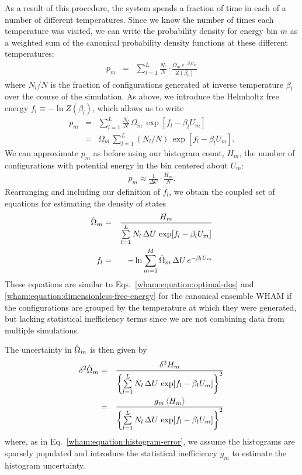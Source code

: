 As a result of this procedure, the system spends a fraction of time in each of a number of different temperatures.  Since we know the number of times each temperature was visited, we can write the probability density for energy bin $m$ as a weighted sum of the canonical probability density functions at these different temperatures:
\begin{eqnarray}
p_m &=& \sum_{l=1}^L \frac{N_l}{N} \cdot \frac{\Omega_m \, e^{-\beta_l U_m}}{Z(\beta_l)} \label{wham:equation:simulated-tempering-sampling-distribution}
\end{eqnarray}
where $N_l/N$ is the fraction of configurations generated at inverse temperature $\beta_l$ over the course of the simulation.  As above, we introduce the Helmholtz free energy $f_l \equiv - \ln Z(\beta_l)$, which allows us to write
\begin{eqnarray}
p_m &=& \sum_{l=1}^L \frac{N_l}{N} \, \Omega_m \, \exp[f_l -  \beta_l U_m] \nonumber \\
&=& \Omega_m \, \sum_{l = 1}^L (N_l / N) \, \exp[ f_l - \beta_l U_m ] .
\end{eqnarray}
We can approximate $p_m$ as before using our histogram count, $H_m$, the number of configurations with potential energy in the bin centered about $U_m$:
\begin{eqnarray}
p_m \approx \frac{1}{\Delta U} \cdot \frac{H_m}{N} .
\end{eqnarray}
Rearranging and including our definition of $f_l$, we obtain the coupled set of equations for estimating the density of states
\begin{eqnarray}
\hat{\Omega}_m &=& \frac{H_m}{\sum\limits_{l=1}^L N_l \, \Delta U \, \exp[f_l - \beta_l U_m]} \label{wham:equation:simulated-tempering-dos} \\
f_l &=& - \ln \sum_{m=1}^M \hat{\Omega}_m \, \Delta U \, e^{-\beta_l U_m}
\end{eqnarray}
These equations are similar to Eqs.\ \ref{wham:equation:optimal-dos} and \ref{wham:equation:dimensionless-free-energy} for the canonical ensemble WHAM if the configurations are grouped by the temperature at which they were generated, but lacking statistical inefficiency terms since we are not combining data from multiple simulations.  

The uncertainty in $\hat{\Omega}_m$ is then given by
\begin{eqnarray}
\delta^2 \hat{\Omega}_m &=& \frac{\delta^2 H_m}{\left\{ \sum\limits_{l=1}^L N_l \, \Delta U \, \exp[f_l - \beta_l U_m] \right\}^2} \nonumber \\
&=& \frac{g_m \, \langle H_m \rangle}{\left\{ \sum\limits_{l=1}^L N_l \, \Delta U \, \exp[f_l - \beta_l U_m] \right\}^2}
\end{eqnarray}
where, as in Eq.\ \ref{wham:equation:histogram-error}, we assume the histograms are sparsely populated and introduce the statistical inefficiency $g_m$ to estimate the histogram uncertainty. 

